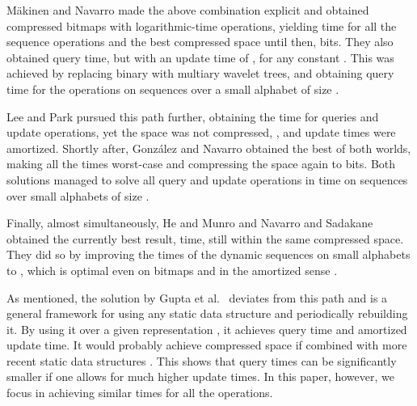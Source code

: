 \documentclass[11pt]{article}
\begin{document}
M\"akinen and Navarro \cite{MN06,MN08} made the above combination explicit
and obtained compressed bitmaps with logarithmic-time operations, yielding
 time for all the sequence operations and the best
compressed space until then,  bits. 
They also obtained  query time, but with
an update time of , for any constant .
This was achieved by replacing binary with multiary wavelet trees, and
obtaining  query time for the operations on sequences over a small
alphabet of size .

Lee and Park \cite{LP07,LP09} pursued this path further, obtaining the
 time for queries and update
operations, yet the space was not compressed, ,
and update times were amortized.
Shortly after, Gonz\'alez and Navarro \cite{GN08,GN09} obtained the best
of both worlds, making all the times worst-case and compressing the space
again to  bits. Both solutions managed to solve all
query and update operations in  time on sequences over small
alphabets of size .

Finally, almost simultaneously, He and Munro \cite{HM10} and Navarro and 
Sadakane \cite{NS10} obtained the currently best result, 
 time, still within the same 
compressed space. They did so by improving the times of
the dynamic sequences on small alphabets to , which is
optimal even on bitmaps and in the amortized sense \cite{FS89}. 

As mentioned, the solution by Gupta et al.~\cite{GHSV07} deviates from this
path and is a general framework for using any static data structure
and periodically rebuilding it. By using it over a given representation
\cite{GMR06}, it achieves  query time and  amortized
update time. It would probably achieve compressed space if combined with more
recent static data structures \cite{BGNN10}. This shows that query times can
be significantly smaller if one allows for much higher update times. In this
paper, however, we focus in achieving similar times for all the
operations.
\end{document}
